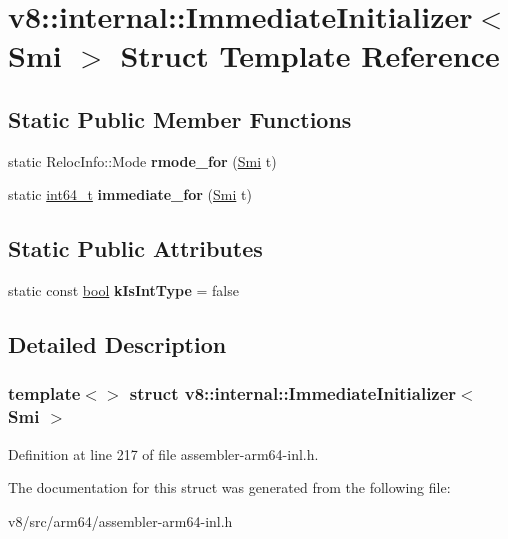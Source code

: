 \hypertarget{structv8_1_1internal_1_1ImmediateInitializer_3_01Smi_01_4}{}\section{v8\+:\+:internal\+:\+:Immediate\+Initializer$<$ Smi $>$ Struct Template Reference}
\label{structv8_1_1internal_1_1ImmediateInitializer_3_01Smi_01_4}
\subsection*{Static Public Member Functions}
\begin{DoxyCompactItemize}
\item 
\mbox{\label{structv8_1_1internal_1_1ImmediateInitializer_3_01Smi_01_4_a8e5d6e32a3261578ba8128b455444df1}} 
static Reloc\+Info\+::\+Mode {\bfseries rmode\+\_\+for} (\mbox{\hyperlink{classv8_1_1internal_1_1Smi}{Smi}} t)
\item 
\mbox{\label{structv8_1_1internal_1_1ImmediateInitializer_3_01Smi_01_4_a419e91d96965ee95b6cf2602b1be0fa2}} 
static \mbox{\hyperlink{classint64__t}{int64\+\_\+t}} {\bfseries immediate\+\_\+for} (\mbox{\hyperlink{classv8_1_1internal_1_1Smi}{Smi}} t)
\end{DoxyCompactItemize}
\subsection*{Static Public Attributes}
\begin{DoxyCompactItemize}
\item 
\mbox{\label{structv8_1_1internal_1_1ImmediateInitializer_3_01Smi_01_4_aa6f1adc0ce96780a7d1a3718fd753189}} 
static const \mbox{\hyperlink{classbool}{bool}} {\bfseries k\+Is\+Int\+Type} = false
\end{DoxyCompactItemize}


\subsection{Detailed Description}
\subsubsection*{template$<$$>$\newline
struct v8\+::internal\+::\+Immediate\+Initializer$<$ Smi $>$}



Definition at line 217 of file assembler-\/arm64-\/inl.\+h.



The documentation for this struct was generated from the following file\+:\begin{DoxyCompactItemize}
\item 
v8/src/arm64/assembler-\/arm64-\/inl.\+h\end{DoxyCompactItemize}

